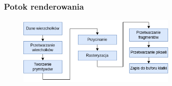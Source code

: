 \documentclass[aspectratio=169]{beamer}
\begin{document}

\begin{frame}
\frametitle{Potok renderowania}
		\begin{figure}
			\centering
			\includegraphics[width=0.7\textwidth]{graphics_pipeline.png}
		\end{figure}
\end{frame}
\end{document}
